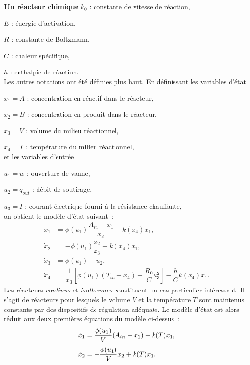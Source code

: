 \begin{exemple}{\bf  Un réacteur chimique }
$k_0$ : constante de vitesse de réaction,

$E$ : énergie d'activation,

$R$ : constante de Boltzmann,

$C$ : chaleur spécifique,

$h$ : enthalpie de réaction.\\

\noindent Les autres notations ont été définies plus haut. En définissant les variables d'état

$x_1 = A$ : concentration en réactif dans le réacteur,

$x_2 = B$ : concentration en produit dans le réacteur,

$x_3 = V$ : volume du milieu réactionnel,

$x_4 = T$ : température du milieu réactionnel,\\

\noindent et les variables d'entrée

$u_1 = w$ : ouverture de vanne,

$u_2 = q_{out}$ : débit de soutirage,

$u_3 = I$ : courant électrique fourni à la résistance chauffante,\\

\noindent on obtient le modèle d'état suivant~:
\begin{equation*} \begin{split} 
\dot x_1 &= \phi(u_1)\dfrac{{\textstyle A_{in} - x_1}}{{\textstyle x_3}} - k(x_4)x_1,\\[0.3em]
\dot x_2 &= - \phi(u_1) \dfrac{x_2}{x_3} + k(x_4)x_1,\\[0.3em]
\dot x_3 &= \phi(u_1) - u_2, \\[0.3em]
\dot x_4 &= \dfrac{{1}}{{x_3}}[\phi(u_1)(T_{in} - x_4) + \dfrac{{R_0}}{{C}}u_3^2] - \dfrac{{h}}{{C}}k(x_4)x_1.
\end{split} \end{equation*}
Les réacteurs {\it continus} et {\it isothermes} constituent un cas particulier intéressant. Il s'agit de réacteurs pour lesquels le volume $V$ et la température $T$ sont maintenus constants par des dispositifs de régulation adéquats. Le modèle d'état est alors réduit aux deux premières équations du modèle ci-dessus~:
\begin{equation} \begin{split} \label{iso}
\dot x_1 &= \dfrac{\phi(u_1)}{{V}} (A_{in} - x_1) - k(T)x_1, \\[0.3em]
\dot x_2 &= - \dfrac{\phi(u_1)}{{V}} x_2 + k(T)x_1.  \xqedhere{4.8cm}{\qed}
\end{split} \end{equation}
\end{exemple}
\vv

